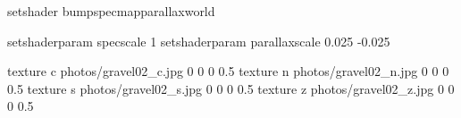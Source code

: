 setshader bumpspecmapparallaxworld

setshaderparam specscale 1
setshaderparam parallaxscale 0.025 -0.025

texture c photos/gravel02_c.jpg 0 0 0 0.5
texture n photos/gravel02_n.jpg 0 0 0 0.5
texture s photos/gravel02_s.jpg 0 0 0 0.5
texture z photos/gravel02_z.jpg 0 0 0 0.5

